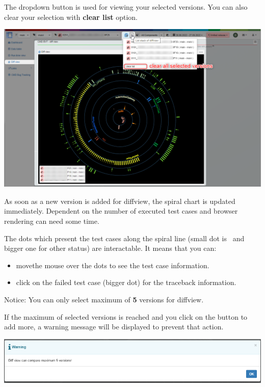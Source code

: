 The dropdown button is used for viewing your selected versions.
You can also clear your selection with \textbf{clear list} option.

\includegraphics[width=1\linewidth]{./pictures/diffview/selected_version.png}

As soon as a new version is added for diffview, the spiral chart is updated 
immediately. Dependent on the number of executed test cases and browser
rendering can need some time.

The dots which present the test cases along the spiral line (small dot is 
\passed\ and bigger one for other status) are interactable. 
It means that you can:
\begin{itemize}
   \item movethe mouse over the dots to see the test case information.
   \item click on the failed test case (bigger dot) for the traceback 
         information.
\end{itemize}

\begin{boxhint}{Notice:}
   You can only select maximum of \textbf{5} versions for diffview.

   If the maximum of selected versions is reached and you click on the button to 
   add more, a warning message will be displayed to prevent that action.
\end{boxhint}

\includegraphics[width=\linewidth]{./pictures/diffview/warning.png}

